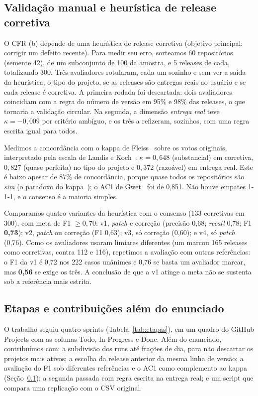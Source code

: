 \documentclass[12pt]{article}
\begin{document}
\subsection{Validação manual e heurística de release corretiva}
\label{sec:validacao}

O CFR (b) depende de uma heurística de release corretiva (objetivo principal: corrigir um defeito recente). Para medir seu erro, sorteamos 60 repositórios (semente 42), de um subconjunto de 100 da amostra, e 5 releases de cada, totalizando 300. Três avaliadores rotularam, cada um sozinho e sem ver a saída da heurística, o tipo do projeto, se as releases são entregas reais ao usuário e se cada release é corretiva. A primeira rodada foi descartada: dois avaliadores coincidiam com a regra do número de versão em 95\% e 98\% das releases, o que tornaria a validação circular. Na segunda, a dimensão \emph{entrega real} teve $\kappa=-0{,}009$ por critério ambíguo, e os três a refizeram, sozinhos, com uma regra escrita igual para todos.

Medimos a concordância com o kappa de Fleiss~\cite{fleiss1971} sobre os votos originais, interpretado pela escala de Landis e Koch~\cite{landis1977}: $\kappa=0{,}648$ (substancial) em corretiva, $0{,}827$ (quase perfeita) no tipo do projeto e $0{,}372$ (razoável) em entrega real. Este é baixo apesar de 87\% de concordância, porque quase todos os repositórios são \emph{sim} (o paradoxo do kappa~\cite{feinstein1990}); o AC1 de Gwet~\cite{gwet2008} foi de 0,851. Não houve empates 1-1-1, e o consenso é a maioria simples.

Comparamos quatro variantes da heurística com o consenso (133 corretivas em 300), com meta de F1 $\geq 0{,}70$: v1, \emph{patch} e correção (precisão 0,68; \emph{recall} 0,78; F1 \textbf{0,73}); v2, \emph{patch} ou correção (F1 0,63); v3, só correção (0,60); e v4, só \emph{patch} (0,76). Como os avaliadores usaram limiares diferentes (um marcou 165 releases como corretivas, contra 112 e 116), repetimos a avaliação com outras referências: o F1 da v1 é 0,72 nos 222 casos unânimes e 0,76 se basta um avaliador marcar, mas \textbf{0,56} se exige os três. A conclusão de que a v1 atinge a meta não se sustenta sob a referência mais estrita.

\subsection{Etapas e contribuições além do enunciado}

O trabalho seguiu quatro sprints (Tabela~\ref{tab:etapas}), em um quadro do GitHub Projects com as colunas Todo, In Progress e Done. Além do enunciado, contribuímos com: a subdivisão dos runs até frações de dia, para não descartar os projetos mais ativos; a escolha da release anterior da mesma linha de versão; a avaliação do F1 sob diferentes referências e o AC1 como complemento ao kappa (Seção~\ref{sec:validacao}); a segunda passada com regra escrita na entrega real; e um script que compara uma replicação com o CSV original.
\end{document}
